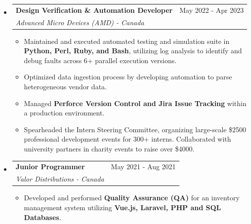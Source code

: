 \documentclass[a4paper,11pt]{article}
\makeatletter
\newcommand{\headingFour}[4]{
	\item
	\begin{tabular*}{0.97\textwidth}{l@{\extracolsep{\fill}}r}
	\textbf{\large\textcolor{customBlue}{#1}} & {#2} \\
	\textit{#3} & \textit{#4} \\
	\end{tabular*}\vspace{-6pt}
}
\makeatother
\begin{document}
\begin{itemize}[leftmargin=*]
\headingFour{Design Verification \& Automation Developer}{May 2022 - Apr 2023}
{Advanced Micro Devices (AMD) - Canada}{~}
\begin{itemize}
	\item{Maintained and executed automated testing and simulation suite in \textbf{Python, Perl, Ruby, and Bash}, utilizing log analysis to identify and debug faults across 6+ parallel execution versions.}\vspace{-2pt}
	\item{Optimized data ingestion process by developing automation to parse heterogeneous vendor data.}\vspace{-2pt}
	\item{Managed \textbf{Perforce Version Control and Jira Issue Tracking} within a production environment.}\vspace{-2pt}
	\item{Spearheaded the Intern Steering Committee, organizing large-scale \$2500 professional development events for 300+ interns. Collaborated with university partners in charity events to raise over \$4000.}\vspace{-2pt}
\end{itemize}

\headingFour{Junior Programmer}{May 2021 - Aug 2021}
{Valor Distributions - Canada}{~}
\begin{itemize}
	\item{Developed and performed \textbf{Quality Assurance (QA)} for an inventory management system utilizing \textbf{Vue.js, Laravel, PHP and SQL Databases}.}\vspace{-2pt}
\end{itemize}

\end{itemize}

\newpage

\end{document}
